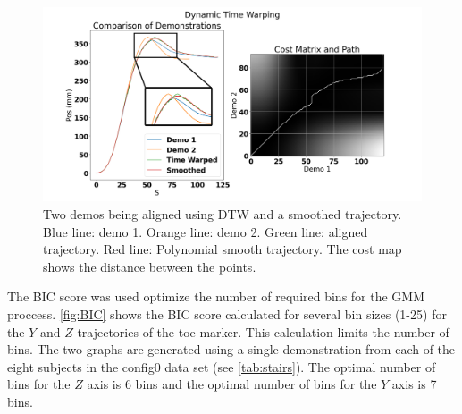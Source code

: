 \begin{figure}[h]
     \centering 
     \includegraphics[width=\textwidth]{images/stairs/DTW_annotated.png} 
     \caption[Polynomial Smoothing of DTW]{Two demos being aligned using DTW and a smoothed trajectory. Blue line: demo 1. Orange line: demo 2. Green line: aligned trajectory. Red line: Polynomial smooth trajectory. The cost map shows the distance between the points.} 
     \label{fig:DTWStairs} 
\end{figure} 



The BIC score was used optimize the number of required bins for the GMM proccess. \autoref{fig:BIC} shows the BIC score calculated for several bin sizes (1-25) for the $ Y $ and $ Z $ trajectories of the toe marker. This calculation limits the number of bins. The two graphs are generated using a single demonstration from each of the eight subjects in the config0 data set (see \autoref{tab:stairs}). The optimal number of bins for the $Z$ axis is 6 bins and the optimal number of bins for the $Y$ axis is 7 bins. 


